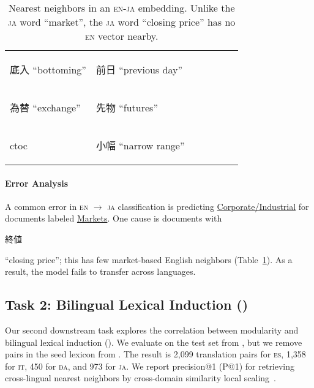 \begin{table}[tb]
\begin{tabular}{|l|l|l|l|p{2cm}|p{2.5cm}|p{2.5cm}|}
 \begin{CJK}{UTF8}{ipxm}底入 ``bottoming''   \end{CJK}&\begin{CJK}{UTF8}{ipxm}前日 ``previous day''    \end{CJK}\\
 \begin{CJK}{UTF8}{ipxm}為替 ``exchange''    \end{CJK}&\begin{CJK}{UTF8}{ipxm}先物 ``futures''         \end{CJK}\\
 \begin{CJK}{UTF8}{ipxm}ctoc                 \end{CJK}&\begin{CJK}{UTF8}{ipxm}小幅 ``narrow range''    \end{CJK}\\
  \hline
  \end{tabular}
 \caption{\label{tab:jp_nn_example} Nearest neighbors
 in an \textsc{en}-\textsc{ja} embedding.
 Unlike the \textsc{ja} word ``market'', the \textsc{ja} word ``closing price'' has no \textsc{en} vector nearby.
   }
\end{table}

\paragraph{Error Analysis}
A common error in \textsc{en} $\rightarrow$ \textsc{ja}
classification is predicting
\underline{Corporate/Industrial} for documents labeled \underline{Markets}.
One cause is documents with \begin{CJK}{UTF8}{ipxm}終値\end{CJK} ``closing price'';
 this has few market-based English neighbors
  (Table~\ref{tab:jp_nn_example}).
  As a result, the model fails to transfer across languages.


\subsection{Task 2: Bilingual Lexical Induction ()}
\label{sec:task2}
Our second downstream task explores the correlation between modularity and
bilingual lexical induction ().
We evaluate on the test set from \citet{lample2018word}, but we remove
pairs in the seed lexicon from \citet{rolston2016collection}.
The result is 2,099 translation pairs for \textsc{es}, 1,358 for
\textsc{it}, 450 for \textsc{da}, and 973 for \textsc{ja}.
We report precision@1 (P@1) for retrieving cross-lingual nearest
neighbors by cross-domain similarity local
scaling~\cite[]{lample2018word}.

